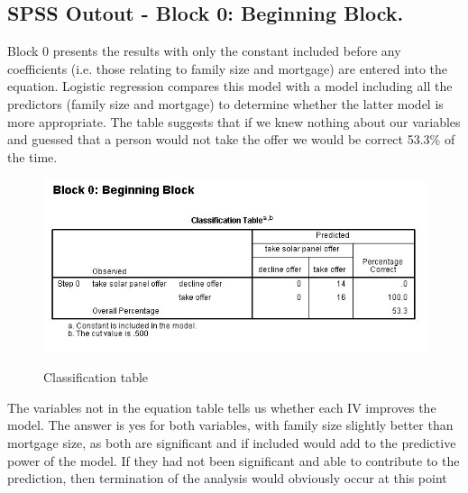 \documentclass[a4paper,12pt]{article}
\begin{document}
\subsection{SPSS Outout  - Block 0: Beginning Block.}
Block 0 presents the results with only the constant included
before any coefficients (i.e. those relating to family size and mortgage) are entered into
the equation. Logistic regression compares this model with a model including all the
predictors (family size and mortgage) to determine whether the latter model is more
appropriate. The table suggests that if we knew nothing about our variables and guessed
that a person would not take the offer we would be correct 53.3\% of the time.
\begin{figure}[h!]
\begin{center}
  \includegraphics[scale=0.6]{images/Logistic3}\\
  \caption{Classification table}
\end{center}
\end{figure}
The variables not in the equation table tells us whether each IV improves the model. The answer is yes for both variables, with family size slightly better than mortgage size, as both are significant and if included would add to the predictive power of the model. If they had not been significant and able to contribute to the prediction,
then termination of the analysis would obviously occur at this point
\end{document}
